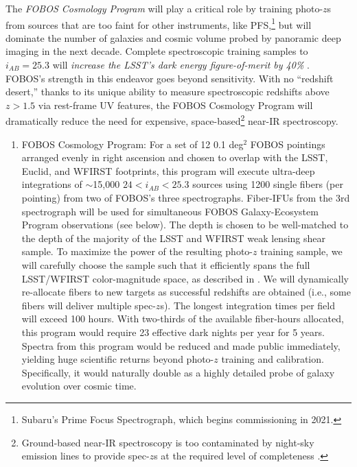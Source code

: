 \documentclass[oneside,11pt]{amsart}
\newcounter{chalno}
\newcommand{\chal}[1]{\refstepcounter{chalno}\label{#1}}
\begin{document}
The {\it FOBOS Cosmology Program} will play a critical role by
training photo-$z$s from sources that are too faint for other
instruments, like PFS,\footnote{Subaru's Prime Focus Spectrograph,
which begins commissioning in 2021.} but will dominate the number of
galaxies and cosmic volume probed by panoramic deep imaging in the
next decade. Complete spectroscopic training samples to $i_{AB} =
25.3$ will \emph{increase the LSST's dark energy figure-of-merit by
40\%} \citep{newman15}. FOBOS's strength in this endeavor goes beyond
sensitivity. With no ``redshift desert,'' thanks to its unique
ability to measure spectroscopic redshifts above $z > 1.5$ via
rest-frame UV features, the FOBOS Cosmology Program will dramatically
reduce the need for expensive, space-based\footnote{Ground-based
near-IR spectroscopy is too contaminated by night-sky emission lines
to provide spec-$z$s at the required level of completeness
\citep{newman15}.} near-IR spectroscopy.

\chal{photozs}
%
\begin{enumerate}[rightmargin=0.2cm,leftmargin=0.2cm]

\item[] {\textsf {\large FOBOS Cosmology Program:}}
  For a set of 12 0.1 deg$^2$ FOBOS pointings arranged evenly in
  right ascension and chosen to overlap with the LSST, Euclid, and
  WFIRST footprints, this program will execute ultra-deep
  integrations of $\sim$15,000 $24 < i_{AB} < 25.3$ sources using
  1200 single fibers (per pointing) from two of FOBOS's three
  spectrographs. Fiber-IFUs from the 3rd spectrograph will be used
  for simultaneous FOBOS Galaxy-Ecosystem Program observations (see
  below). The depth is chosen to be well-matched to the depth of the
  majority of the LSST and WFIRST weak lensing shear sample. To
  maximize the power of the resulting photo-$z$ training sample, we
  will carefully choose the sample such that it efficiently spans the
  full LSST/WFIRST color-magnitude space, as described in
  \citet{masters15, masters19}. We will dynamically re-allocate
  fibers to new targets as successful redshifts are obtained (i.e.,
  some fibers will deliver multiple spec-$z$s). The longest
  integration times per field will exceed 100 hours. With two-thirds
  of the available fiber-hours allocated, this program would require
  23 effective dark nights per year for 5 years. Spectra from this
  program would be reduced and made public immediately, yielding huge
  scientific returns beyond photo-$z$ training and calibration.
  Specifically, it would naturally double as a highly detailed probe
  of galaxy evolution over cosmic time.
\end{enumerate}
\end{document}
